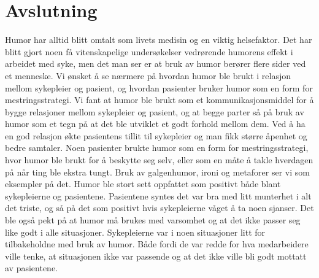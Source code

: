 \chapter{Avslutning}

Humor har alltid blitt omtalt som livets medisin og en viktig helsefaktor. Det
har blitt gjort noen få vitenskapelige undersøkelser vedrørende humorens effekt
i arbeidet med syke, men det man ser er at bruk av humor berører flere sider
ved et menneske. Vi ønsket å se nærmere på hvordan humor ble brukt i relasjon
mellom sykepleier og pasient, og hvordan pasienter bruker humor som en form for
mestringsstrategi. Vi fant at humor ble brukt som et kommunikasjonsmiddel for å
bygge relasjoner mellom sykepleier og pasient, og at begge parter så på bruk av
humor som et tegn på at det ble utviklet et godt forhold mellom dem. Ved å ha
en god relasjon økte pasientens tillit til sykepleier og man fikk større
åpenhet og bedre samtaler. Noen pasienter brukte humor som en form for
mestringsstrategi, hvor humor ble brukt for å beskytte seg selv, eller som en
måte å takle hverdagen på når ting ble ekstra tungt. Bruk av galgenhumor, ironi
og metaforer ser vi som eksempler på det. Humor ble stort sett oppfattet som
positivt både blant sykepleierne og pasientene. Pasientene syntes det var bra
med litt munterhet i alt det triste, og så på det som positivt hvis
sykepleierne våget å ta noen sjanser. Det ble også pekt på at humor må brukes
med varsomhet og at det ikke passer seg like godt i alle situasjoner.
Sykepleierne var i noen situasjoner litt for tilbakeholdne med bruk av humor.
Både fordi de var redde for hva medarbeidere ville tenke, at situasjonen ikke
var passende og at det ikke ville bli godt mottatt av pasientene.
